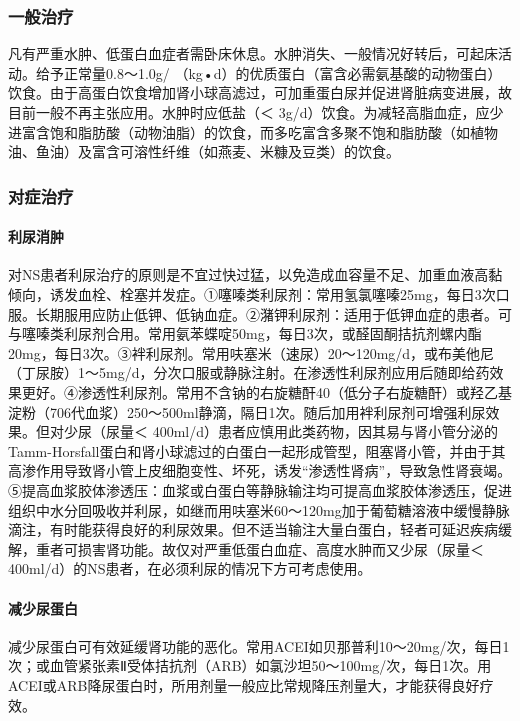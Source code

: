 \subsubsection{一般治疗}

凡有严重水肿、低蛋白血症者需卧床休息。水肿消失、一般情况好转后，可起床活动。给予正常量0.8～1.0g/
（kg•d）的优质蛋白（富含必需氨基酸的动物蛋白）饮食。由于高蛋白饮食增加肾小球高滤过，可加重蛋白尿并促进肾脏病变进展，故目前一般不再主张应用。水肿时应低盐（＜
3g/d）饮食。为减轻高脂血症，应少进富含饱和脂肪酸（动物油脂）的饮食，而多吃富含多聚不饱和脂肪酸（如植物油、鱼油）及富含可溶性纤维（如燕麦、米糠及豆类）的饮食。

\subsubsection{对症治疗}

\paragraph{利尿消肿}

对NS患者利尿治疗的原则是不宜过快过猛，以免造成血容量不足、加重血液高黏倾向，诱发血栓、栓塞并发症。①噻嗪类利尿剂：常用氢氯噻嗪25mg，每日3次口服。长期服用应防止低钾、低钠血症。②潴钾利尿剂：适用于低钾血症的患者。可与噻嗪类利尿剂合用。常用氨苯蝶啶50mg，每日3次，或醛固酮拮抗剂螺内酯20mg，每日3次。③袢利尿剂。常用呋塞米（速尿）20～120mg/d，或布美他尼（丁尿胺）1～5mg/d，分次口服或静脉注射。在渗透性利尿剂应用后随即给药效果更好。④渗透性利尿剂。常用不含钠的右旋糖酐40（低分子右旋糖酐）或羟乙基淀粉（706代血浆）250～500ml静滴，隔日1次。随后加用袢利尿剂可增强利尿效果。但对少尿（尿量＜
400ml/d）患者应慎用此类药物，因其易与肾小管分泌的Tamm-Horsfall蛋白和肾小球滤过的白蛋白一起形成管型，阻塞肾小管，并由于其高渗作用导致肾小管上皮细胞变性、坏死，诱发“渗透性肾病”，导致急性肾衰竭。⑤提高血浆胶体渗透压：血浆或白蛋白等静脉输注均可提高血浆胶体渗透压，促进组织中水分回吸收并利尿，如继而用呋塞米60～120mg加于葡萄糖溶液中缓慢静脉滴注，有时能获得良好的利尿效果。但不适当输注大量白蛋白，轻者可延迟疾病缓解，重者可损害肾功能。故仅对严重低蛋白血症、高度水肿而又少尿（尿量＜
400ml/d）的NS患者，在必须利尿的情况下方可考虑使用。

\paragraph{减少尿蛋白}

减少尿蛋白可有效延缓肾功能的恶化。常用ACEI如贝那普利10～20mg/次，每日1次；或血管紧张素Ⅱ受体拮抗剂（ARB）如氯沙坦50～100mg/次，每日1次。用ACEI或ARB降尿蛋白时，所用剂量一般应比常规降压剂量大，才能获得良好疗效。

